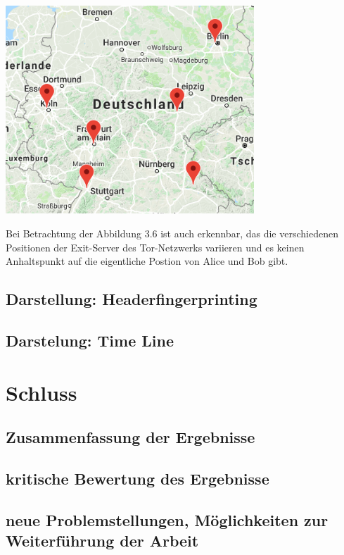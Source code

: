 \documentclass[
    fontsize=12pt,
    headings=small,
    parskip=half,           %
    bibliography=totoc,
    numbers=noenddot,       %
    open=any,               %
    ]{scrreprt}
\begin{document}
\begin{center}
\includegraphics[width=0.7\textwidth]{../pic/IP-Tor-SetB.png}\\
\end{center}

Bei Betrachtung der Abbildung 3.6 ist auch erkennbar, das die verschiedenen Positionen der Exit-Server des Tor-Netzwerks variieren und es keinen Anhaltspunkt auf die eigentliche Postion von Alice und Bob gibt. 


\newpage
\section{Darstellung: Headerfingerprinting}


\newpage
\section{Darstelung: Time Line}
\chapter{Schluss}
\section{Zusammenfassung der Ergebnisse}
\section{kritische Bewertung des Ergebnisse}
\section{neue Problemstellungen, Möglichkeiten zur Weiterführung der Arbeit}
\end{document}
